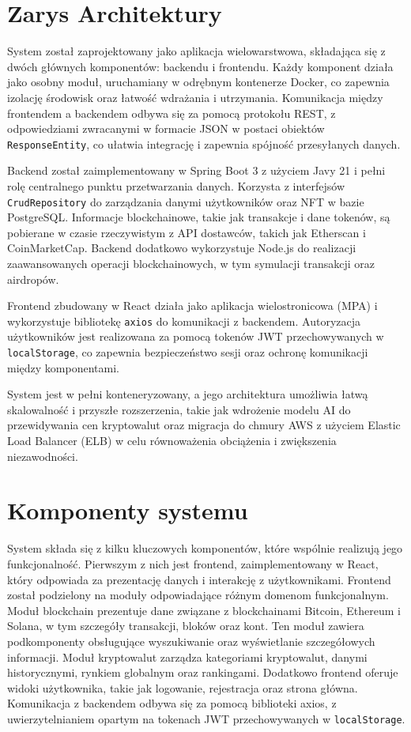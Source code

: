 \section{Zarys Architektury}

System został zaprojektowany jako aplikacja wielowarstwowa, składająca się z dwóch głównych komponentów: backendu i frontendu. Każdy komponent działa jako osobny moduł, uruchamiany w odrębnym kontenerze Docker, co zapewnia izolację środowisk oraz łatwość wdrażania i utrzymania. Komunikacja między frontendem a backendem odbywa się za pomocą protokołu REST, z odpowiedziami zwracanymi w formacie JSON w postaci obiektów \texttt{ResponseEntity}, co ułatwia integrację i zapewnia spójność przesyłanych danych.

Backend został zaimplementowany w Spring Boot 3 z użyciem Javy 21 i pełni rolę centralnego punktu przetwarzania danych. Korzysta z interfejsów \texttt{CrudRepository} do zarządzania danymi użytkowników oraz NFT w bazie PostgreSQL. Informacje blockchainowe, takie jak transakcje i dane tokenów, są pobierane w czasie rzeczywistym z API dostawców, takich jak Etherscan i CoinMarketCap. Backend dodatkowo wykorzystuje Node.js do realizacji zaawansowanych operacji blockchainowych, w tym symulacji transakcji oraz airdropów.

Frontend zbudowany w React działa jako aplikacja wielostronicowa (MPA) i wykorzystuje bibliotekę \texttt{axios} do komunikacji z backendem. Autoryzacja użytkowników jest realizowana za pomocą tokenów JWT przechowywanych w \texttt{localStorage}, co zapewnia bezpieczeństwo sesji oraz ochronę komunikacji między komponentami.

System jest w pełni konteneryzowany, a jego architektura umożliwia łatwą skalowalność i przyszłe rozszerzenia, takie jak wdrożenie modelu AI do przewidywania cen kryptowalut oraz migracja do chmury AWS z użyciem Elastic Load Balancer (ELB) w celu równoważenia obciążenia i zwiększenia niezawodności.



\section{Komponenty systemu}
System składa się z kilku kluczowych komponentów, które wspólnie realizują jego funkcjonalność. Pierwszym z nich jest frontend, zaimplementowany w React, który odpowiada za prezentację danych i interakcję z użytkownikami. Frontend został podzielony na moduły odpowiadające różnym domenom funkcjonalnym. Moduł blockchain prezentuje dane związane z blockchainami Bitcoin, Ethereum i Solana, w tym szczegóły transakcji, bloków oraz kont. Ten moduł zawiera podkomponenty obsługujące wyszukiwanie oraz wyświetlanie szczegółowych informacji. Moduł kryptowalut zarządza kategoriami kryptowalut, danymi historycznymi, rynkiem globalnym oraz rankingami. Dodatkowo frontend oferuje widoki użytkownika, takie jak logowanie, rejestracja oraz strona główna. Komunikacja z backendem odbywa się za pomocą biblioteki axios, z uwierzytelnianiem opartym na tokenach JWT przechowywanych w \texttt{localStorage}.

